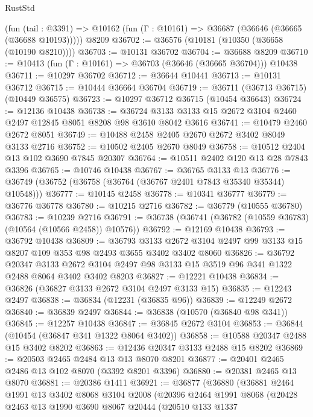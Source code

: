 \begin{lexlean}{RustStd}
\begin{coremodule}
    (fun (tail : @3391) => @10162 (fun (Γ : @10161) => @36687 (@36646 (@36665 (@36688 @10193)))))
    @8209
@36702 := @36576 (@10181 (@10350 (@36658 (@10190 @8210))))
@36703 := @10131 @36702
@36704 := @36688 @8209
@36710 := @10413 (fun (Γ : @10161) => @36703 (@36646 (@36665 @36704))) @10438
@36711 := @10297 @36702
@36712 := @36644 @10441
@36713 := @10131 @36712
@36715 := @10444 @36664 @36704
@36719 := @36711 (@36713 @36715) (@10449 @36575)
@36723 := @10297 @36712 @36715 (@10454 @36643)
@36724 := @12136 @10438
@36738 := @36724 @3133 @3133 @15 @2672 @3104 @2460 @2497 @12845 @8051 @8208 @98 @3610 @8042 @3616
@36741 := @10479 @2460 @2672 @8051
@36749 := @10488 @2458 @2405 @2670 @2672 @3402 @8049 @3133 @2716
@36752 := @10502 @2405 @2670 @8049
@36758 := @10512 @2404 @13 @102 @3690 @7845 @20307
@36764 := @10511 @2402 @120 @13 @28 @7843 @3396
@36765 := @10746 @10438
@36767 := @36765 @3133 @13
@36776 := @36749 (@36752 (@36758 (@36764 (@36767 @2401 @7843 @35340 @35344) @10548)))
@36777 := @10145 @2458
@36778 := @10341 @36777
@36779 := @36776 @36778
@36780 := @10215 @2716
@36782 := @36779 (@10555 @36780)
@36783 := @10239 @2716
@36791 := @36738 (@36741 (@36782 (@10559 @36783) (@10564 (@10566 @2458)) @10576))
@36792 := @12169 @10438
@36793 := @36792 @10438
@36809 := @36793
    @3133
    @2672
    @3104
    @2497
    @99
    @3133
    @15
    @8207
    @109
    @353
    @98
    @2493
    @3655
    @3402
    @3402
    @8060
@36826 := @36792
    @20347
    @3133
    @2672
    @3104
    @2497
    @98
    @3133
    @15
    @3519
    @96
    @341
    @1322
    @2488
    @8064
    @3402
    @3402
    @8203
@36827 := @12221 @10438
@36834 := @36826 (@36827 @3133 @2672 @3104 @2497 @3133 @15)
@36835 := @12243 @2497
@36838 := @36834 (@12231 (@36835 @96))
@36839 := @12249 @2672
@36840 := @36839 @2497
@36844 := @36838 (@10570 (@36840 @98 @341))
@36845 := @12257 @10438
@36847 := @36845 @2672 @3104
@36853 := @36844 (@10454 (@36847 @341 @1322 @8064 @3402))
@36858 := @10588 @20347 @2488 @15 @3402 @8202
@36863 := @12436 @20347 @3133 @2488 @15 @8202
@36869 := @20503 @2465 @2484 @13 @13 @8070 @8201
@36877 := @20401 @2465 @2486 @13 @102 @8070 (@3392 @8201 @3396)
@36880 := @20381 @2465 @13 @8070
@36881 := @20386 @1411
@36921 := @36877
    (@36880
      (@36881
        @2464
        @1991
        @13
        @3402
        @8068
        @3104
        @2008
        (@20396
          @2464
          @1991
          @8068
          (@20428
            @2463
            @13
            @1990
            @3690
            @8067
            @20444
            (@20510
              @133
              @1337

\end{coremodule}
\end{lexlean}
